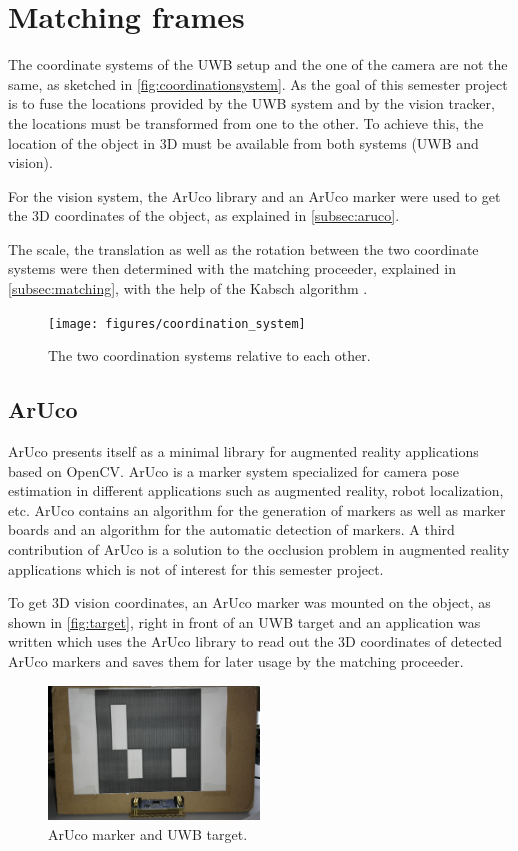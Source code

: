 \section{Matching frames}
The coordinate systems of the \ac{UWB} setup and the one of the camera are not the same, as sketched in \autoref{fig:coordinationsystem}. As the goal of this semester project is to fuse the locations provided by the \ac{UWB} system and by the vision tracker, the locations must be transformed from one to the other. To achieve this, the location of the object in 3D must be available from both systems (\ac{UWB} and vision).

For the vision system, the ArUco \cite{Aruco2014} library and an ArUco marker were used to get the 3D coordinates of the object, as explained in \autoref{subsec:aruco}.

The scale, the translation as well as the rotation between the two coordinate systems were then determined with the matching proceeder, explained in \autoref{subsec:matching}, with the help of the Kabsch algorithm \cite{Kabsch:a12999}.
\begin{figure}[ht!]\centering
	\texttt{[image: figures/coordination\_system]}
	\caption{The two coordination systems relative to each other.}\label{fig:coordinationsystem}
\end{figure}

\subsection{ArUco}\label{subsec:aruco}
ArUco \cite{Aruco2014} presents itself as a minimal library for augmented reality applications based on OpenCV. ArUco is a marker system specialized for camera pose estimation in different applications such as augmented reality, robot localization, etc. ArUco contains an algorithm for the generation of markers as well as marker boards and an algorithm for the automatic detection of markers. A third contribution of ArUco is a solution to the occlusion problem in augmented reality applications which is not of interest for this semester project.

To get 3D vision coordinates, an ArUco marker was mounted on the object, as shown in \autoref{fig:target}, right in front of an \ac{UWB} target and an application was written which uses the ArUco library to read out the 3D coordinates of detected ArUco markers and saves them for later usage by the matching proceeder.
\begin{figure}[ht!]\centering
	\includegraphics[width=0.5\textwidth]{figures/Box_cut.jpg}
	\caption{ArUco marker and \ac{UWB} target.}\label{fig:target}
\end{figure}

